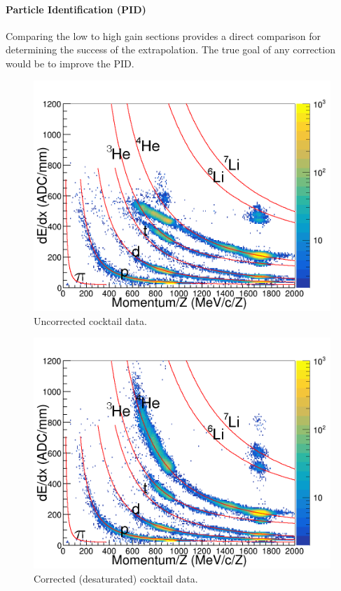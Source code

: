 \documentclass[review]{elsarticle}
\begin{document}
\paragraph{Particle Identification (PID)}

Comparing the low to high gain sections provides a direct comparison for determining the success of the extrapolation. The true goal of any correction would be to improve the PID. 
\begin{figure}[h]
\includegraphics[width=\linewidth]{cocktail_raw}
\caption{Uncorrected cocktail data.}
\label{fig:cocktail_raw}
\end{figure}

\begin{figure}[ht]
\includegraphics[width=\linewidth]{cocktail_desat}
\caption{Corrected (desaturated) cocktail data.}
\label{fig:data_desat}
\end{figure}
\end{document}
